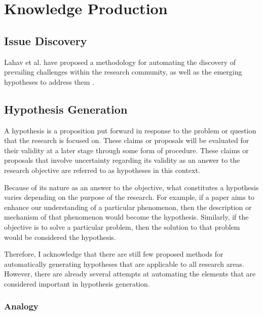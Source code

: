 \documentclass{book}
\begin{document}
\section{Knowledge Production}


\subsection{Issue Discovery}
Lahav et al. have proposed a methodology for automating the discovery of prevailing challenges within the research community, as well as the emerging hypotheses to address them \cite{lahav2022search}.

\subsection{Hypothesis Generation}
A hypothesis is a proposition put forward in response to the problem or question that the research is focused on. These claims or proposals will be evaluated for their validity at a later stage through some form of procedure. These claims or proposals that involve uncertainty regarding its validity as an answer to the research objective are referred to as hypotheses in this context.

Because of its nature as an answer to the objective, what constitutes a hypothesis varies depending on the purpose of the research. For example, if a paper aims to enhance our understanding of a particular phenomenon, then the description or mechanism of that phenomenon would become the hypothesis. Similarly, if the objective is to solve a particular problem, then the solution to that problem would be considered the hypothesis. 

Therefore, I acknowledge that there are still few proposed methods for automatically generating hypotheses that are applicable to all research areas. However, there are already several attempts at automating the elements that are considered important in hypothesis generation.

\subsubsection{Analogy} 
\end{document}
